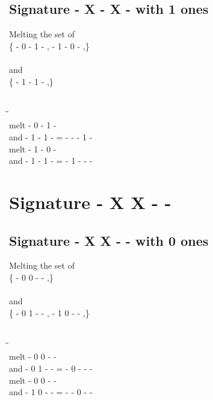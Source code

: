\documentclass{article}
\begin{document}
\subsection{Signature - X - X - with 1 ones}
Melting the set of\\
\{ -  0  -  1  - , -  1  -  0  - ,\}\\\\
and\\
\{ -  1  -  1  - ,\}\\\\
\begin{tabbing}
\hspace{3cm}\=\hspace{3cm}\=\hspace{3cm}\\[1cm]
melt\> -  0  -  1  - \\
and\> -  1  -  1  - \>
 =  -  -  -  1  - \\[1mm]
melt\> -  1  -  0  - \\
and\> -  1  -  1  - \>
 =  -  1  -  -  - \\[1mm]
\end{tabbing}
\newpage
\section{Signature - X X - - }
\subsection{Signature - X X - - with 0 ones}
Melting the set of\\
\{ -  0  0  -  - ,\}\\\\
and\\
\{ -  0  1  -  - , -  1  0  -  - ,\}\\\\
\begin{tabbing}
\hspace{3cm}\=\hspace{3cm}\=\hspace{3cm}\\[1cm]
melt\> -  0  0  -  - \\
and\> -  0  1  -  - \>
 =  -  0  -  -  - \\[1mm]
melt\> -  0  0  -  - \\
and\> -  1  0  -  - \>
 =  -  -  0  -  - \\[1mm]
\end{tabbing}
\newpage
\end{document}
